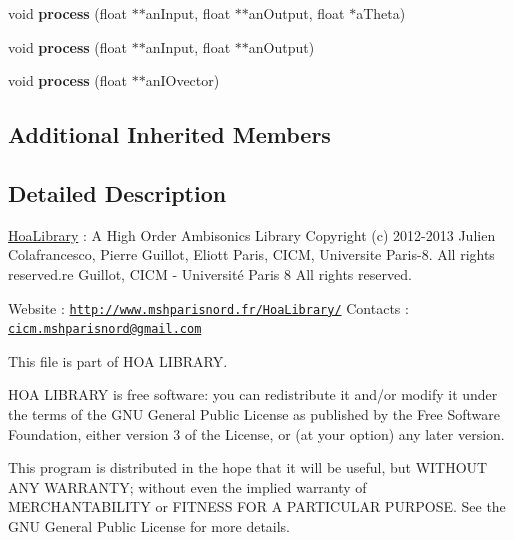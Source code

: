 \begin{DoxyCompactItemize}
\item 
\hypertarget{class_ambisonic_rotate_a5148f90cb041d14c3019e750e8e76c51}{void {\bfseries process} (float $\ast$$\ast$an\-Input, float $\ast$$\ast$an\-Output, float $\ast$a\-Theta)}\label{class_ambisonic_rotate_a5148f90cb041d14c3019e750e8e76c51}

\item 
\hypertarget{class_ambisonic_rotate_a3368bfcc5764cffce92905c3acc89380}{void {\bfseries process} (float $\ast$$\ast$an\-Input, float $\ast$$\ast$an\-Output)}\label{class_ambisonic_rotate_a3368bfcc5764cffce92905c3acc89380}

\item 
\hypertarget{class_ambisonic_rotate_af9e6cec0c56a01ad9e6e7f8b3ea12e7b}{void {\bfseries process} (float $\ast$$\ast$an\-I\-Ovector)}\label{class_ambisonic_rotate_af9e6cec0c56a01ad9e6e7f8b3ea12e7b}

\end{DoxyCompactItemize}
\subsection*{Additional Inherited Members}


\subsection{Detailed Description}
\hyperlink{interface_hoa_library}{Hoa\-Library} \-: A High Order Ambisonics Library Copyright (c) 2012-\/2013 Julien Colafrancesco, Pierre Guillot, Eliott Paris, C\-I\-C\-M, Universite Paris-\/8. All rights reserved.\-re Guillot, C\-I\-C\-M -\/ Université Paris 8 All rights reserved.

Website \-: \href{http://www.mshparisnord.fr/HoaLibrary/}{\tt http\-://www.\-mshparisnord.\-fr/\-Hoa\-Library/} Contacts \-: \href{mailto:cicm.mshparisnord@gmail.com}{\tt cicm.\-mshparisnord@gmail.\-com}

This file is part of H\-O\-A L\-I\-B\-R\-A\-R\-Y.

H\-O\-A L\-I\-B\-R\-A\-R\-Y is free software\-: you can redistribute it and/or modify it under the terms of the G\-N\-U General Public License as published by the Free Software Foundation, either version 3 of the License, or (at your option) any later version.

This program is distributed in the hope that it will be useful, but W\-I\-T\-H\-O\-U\-T A\-N\-Y W\-A\-R\-R\-A\-N\-T\-Y; without even the implied warranty of M\-E\-R\-C\-H\-A\-N\-T\-A\-B\-I\-L\-I\-T\-Y or F\-I\-T\-N\-E\-S\-S F\-O\-R A P\-A\-R\-T\-I\-C\-U\-L\-A\-R P\-U\-R\-P\-O\-S\-E. See the G\-N\-U General Public License for more details.

